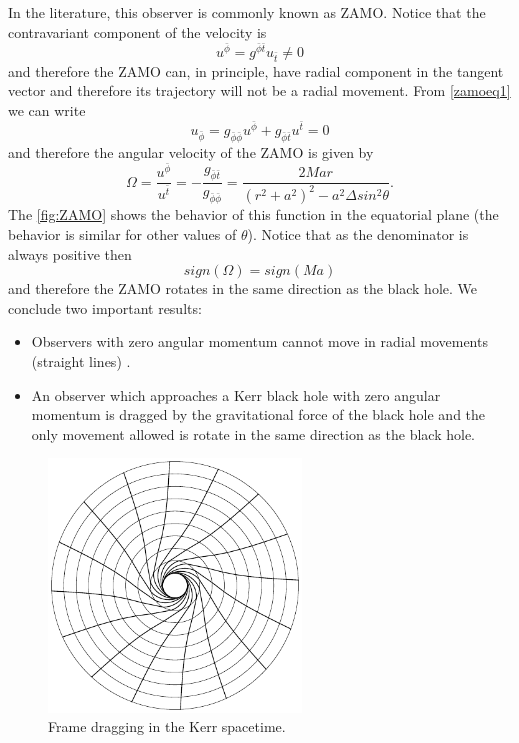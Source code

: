 In the literature, this observer is commonly known as \gls{ZAMO}. Notice that the contravariant component of the velocity is
\begin{equation}
 u^{\bar{\phi}}=g^{\bar{\phi} \bar{t}}u_{\bar{t}} \neq 0
\end{equation}
and therefore the \gls{ZAMO} can, in principle, have radial component in the tangent vector and therefore its trajectory will not be a radial movement. From \cref{zamoeq1} we can write
\begin{equation}
 u_{\bar{\phi}}=g_{\bar{\phi} \bar{\phi}}u^{\bar{\phi}} + g_{\bar{\phi} \bar{t}} u^{\bar{t}}=0
\end{equation}
and therefore the angular velocity of the \gls{ZAMO} is given by
\begin{equation}
 \Omega=\frac{u^{\bar{\phi}}}{u^{\bar{t}}}=-\frac{g_{\bar{\phi} \bar{t}}}{g_{\bar{\phi} \bar{\phi}}}=\frac{2 M a r}{(r^2+a^2)^2-a^2 \Delta sin^2\theta}.
\end{equation}
The \cref{fig:ZAMO} shows the behavior of this function in the equatorial plane (the behavior is similar for other values of $\theta$). Notice that as the denominator is always positive then
\begin{equation}
 sign(\Omega)=sign(M a)
\end{equation}
and therefore the \gls{ZAMO} rotates in the same direction as the black hole. We conclude two important results:
\begin{itemize}
 \item Observers with zero angular momentum cannot move in radial movements (straight lines) .
 \item An observer which approaches a Kerr black hole with zero angular momentum is dragged by the gravitational force of the black hole and the only movement allowed is rotate in the same direction as the black hole.
\end{itemize}
  \begin{figure}[htp!]  
\begin{center}
 \centerline{\includegraphics[width=0.6\textwidth]{img/Introd/Dragg.png}}
 \end{center}
 \caption{Frame dragging in the Kerr spacetime. }
 \label{fig:Dragg}
\end{figure} 
